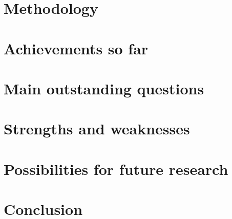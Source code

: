 \documentclass[12pt]{article}
\begin{document}
\section{Methodology}


\section{Achievements so far}
\section{Main outstanding questions}
\section{Strengths and weaknesses}
\section{Possibilities for future research}
\section{Conclusion}
\end{document}
